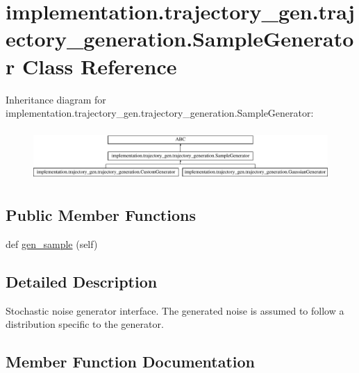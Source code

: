 \hypertarget{classimplementation_1_1trajectory__gen_1_1trajectory__generation_1_1_sample_generator}{}\section{implementation.\+trajectory\+\_\+gen.\+trajectory\+\_\+generation.\+Sample\+Generator Class Reference}
\label{classimplementation_1_1trajectory__gen_1_1trajectory__generation_1_1_sample_generator}
Inheritance diagram for implementation.\+trajectory\+\_\+gen.\+trajectory\+\_\+generation.\+Sample\+Generator\+:\begin{figure}[H]
\begin{center}
\leavevmode
\includegraphics[height=1.971831cm]{classimplementation_1_1trajectory__gen_1_1trajectory__generation_1_1_sample_generator}
\end{center}
\end{figure}
\subsection*{Public Member Functions}
\begin{DoxyCompactItemize}
\item 
def \hyperlink{classimplementation_1_1trajectory__gen_1_1trajectory__generation_1_1_sample_generator_a38288f65e684a8bd47aabc739fc5422e}{gen\+\_\+sample} (self)
\end{DoxyCompactItemize}


\subsection{Detailed Description}
\begin{DoxyVerb}Stochastic noise generator interface.
The generated noise is assumed to follow a distribution specific to the generator.
\end{DoxyVerb}
 

\subsection{Member Function Documentation}
\mbox{\label{classimplementation_1_1trajectory__gen_1_1trajectory__generation_1_1_sample_generator_a38288f65e684a8bd47aabc739fc5422e}} 
